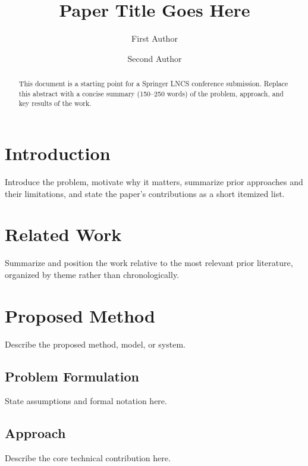 \documentclass{llncs}
\begin{document}
\title{Paper Title Goes Here}

\author{First Author \and Second Author}


\maketitle

\begin{abstract}
This document is a starting point for a Springer LNCS conference submission. Replace this abstract with a concise summary (150--250 words) of the problem, approach, and key results of the work.
\end{abstract}

\section{Introduction}
Introduce the problem, motivate why it matters, summarize prior approaches and their limitations, and state the paper's contributions as a short itemized list.

\section{Related Work}
Summarize and position the work relative to the most relevant prior literature, organized by theme rather than chronologically.

\section{Proposed Method}
Describe the proposed method, model, or system.

\subsection{Problem Formulation}
State assumptions and formal notation here.

\subsection{Approach}
Describe the core technical contribution here.
\end{document}
